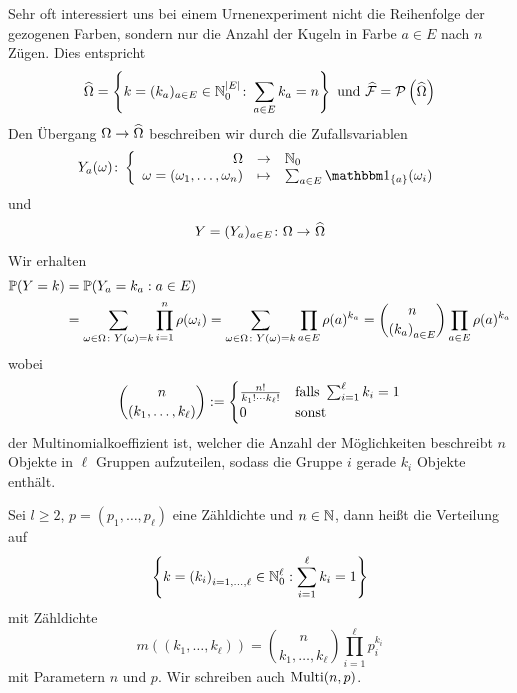 Sehr oft interessiert uns bei einem Urnenexperiment nicht die Reihenfolge der gezogenen Farben, sondern nur die Anzahl der Kugeln in Farbe $a \in E$ nach $n$ Zügen. Dies entspricht
\begin{equation*}
	 \widehat{\Omega} 
	 = \left\{ k = (k_a)_{a \in E} \in \mathbb{N}_{0}^{\left| E \right|} \colon \sum_{a \in E} k_a = n \right\}
	 \text{ und } \widehat{\mathcal{F}} = \mathcal{P}\left( \widehat{\Omega} \right)
\end{equation*}
Den Übergang $\Omega \to \widehat{\Omega}$ beschreiben wir durch die Zufallsvariablen
\begin{equation*}
	\bigabb{Y_a(\omega)}{\Omega}{\N_{0}}%
    {\omega = (\omega_1,\dots, \omega_n)}%
    {\sum_{a \in E} \one_{\menge{a}}(\omega_i)} 
\end{equation*}
und
\begin{equation*}
	\abb{Y = (Y_a)_{a \in E}}{\Omega}{\dach{\Omega}}
\end{equation*}
Wir erhalten
\begin{equation*}
	\begin{aligned}
		\P(Y=k) &= \P(Y_a = k_a : a \in E) \\
		&= \sum_{\omega \in \Omega \colon Y(\omega) = k} \prod_{i=1}^n \rho(\omega_i)
		= \sum_{\omega \in \Omega \colon Y(\omega) = k} \prod_{a \in E} \rho(a)^{k_a} 
		= \binom{n}{\folge{k_a}[a \in E]} \prod_{a \in E} \rho(a)^{k_a}
	\end{aligned}
\end{equation*}
wobei
\begin{equation*}
	\binom{n}{(k_1 , \dots , k_\ell)} \mathrel{:=} \begin{cases}
	\frac{n!}{k_1 ! \cdots k_\ell !} & \text{falls } \sum_{i=1}^\ell k_i = 1 \\
	0 & \text{sonst}
	\end{cases}
\end{equation*}
der Multinomialkoeffizient ist, welcher die Anzahl der Möglichkeiten beschreibt $n$ Objekte in $\ell$ Gruppen aufzuteilen, sodass die Gruppe $i$ gerade $k_i$ Objekte enthält.

\begin{definition}
	Sei $l \geq 2$, $p=(p_1 , \dots , p_\ell)$ eine Zähldichte und $n \in \mathbb{N}$, dann heißt die Verteilung auf 
	\begin{equation*}
		\menge{k=\folge{k_i}[i=1, \dots , \ell] \in \N_0^\ell : \sum_{i=1}^\ell k_i = 1}
	\end{equation*}
	mit Zähldichte
	\begin{equation*}
		m((k_1 , \dots , k_\ell)) = \binom{n}{k_1 , \dots , k_\ell} \prod_{i=1}^\ell p_i^{k_i}
	\end{equation*}
	 mit Parametern $n$ und $p$. Wir schreiben auch $\operatorname{Multi}(n,p)$.
\end{definition}


